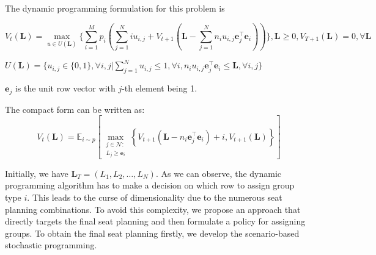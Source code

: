 
The dynamic programming formulation for this problem is

$$V_{t}(\mathbf{L}) = \max_{u \in U(\mathbf{L})}\{ \sum_{i=1}^{M} p_i ( \sum_{j=1}^{N} i u_{i,j} + V_{t+1}(\mathbf{L}- \sum_{j=1}^{N} n_i u_{i,j}\mathbf{e}_j^{\top} \mathbf{e}_{i}))\}, \mathbf{L} \geq 0, V_{T+1}(\mathbf{L}) =0, \forall \mathbf{L}$$


$U(\mathbf{L}) = \{u_{i,j} \in\{0,1\}, \forall i,j| \sum_{j=1}^{N} u_{i,j} \leq 1, \forall i, n_{i}u_{i,j}\mathbf{e}_j^{\top} \mathbf{e}_{i} \leq \mathbf{L}, \forall i,j \}$

$\mathbf{e}_j$ is the unit row vector with $j$-th element being 1.

The compact form can be written as:
$$V_{t}(\mathbf{L}) = \mathbb{E}_{i \sim p}\left[\max_{\substack{j \in \mathcal{N}: \\ L_j \geqslant \mathbf{e}_{i}}}\left\{V_{t+1}\left(\mathbf{L}- n_{i}\mathbf{e}_j^{\top} \mathbf{e}_{i}\right)+ i, V_{t+1}(\mathbf{L})\right\}\right]$$


Initially, we have $\mathbf{L}_{T} = (L_1, L_2, \ldots, L_{N})$. As we can observe, the dynamic programming algorithm has to make a decision on which row to assign group type $i$. This leads to the curse of dimensionality due to the numerous seat planning combinations. To avoid this complexity, we propose an approach that directly targets the final seat planning and then formulate a policy for assigning groups. To obtain the final seat planning firstly, we develop the scenario-based stochastic programming.








